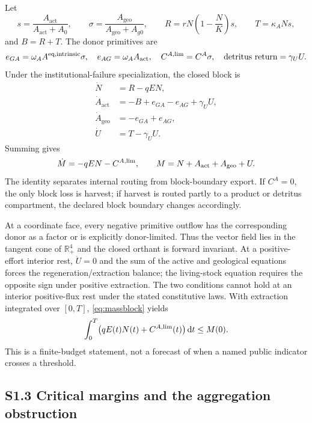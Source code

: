 \documentclass[11pt]{article}
\newcommand{\Rpos}{\mathbb{R}_{+}}
\newcommand{\dd}{\,\mathrm{d}}
\begin{document}
Let
\begin{equation}
s=\frac{A_{\mathrm{act}}}{A_{\mathrm{act}}+A_0},\qquad
\sigma=\frac{A_{\mathrm{geo}}}{A_{\mathrm{geo}}+A_{g0}},\qquad
R=rN\left(1-\frac NK\right)s,\qquad T=\kappa_A Ns,
\end{equation}
and $B=R+T$. The donor primitives are
\begin{equation}
e_{GA}=\omega_A A^{\rm eq,intrinsic}\sigma,
\quad e_{AG}=\omega_A A_{\mathrm{act}},
\quad C^{A,\rm lim}=C^A\sigma,
\quad \text{detritus return}=\gamma_UU.
\end{equation}
Under the institutional-failure specialization, the closed block is
\begin{align}
\dot N&=R-qEN,\\
\dot A_{\mathrm{act}}&=-B+e_{GA}-e_{AG}+\gamma_UU,\\
\dot A_{\mathrm{geo}}&=-e_{GA}+e_{AG},\\
\dot U&=T-\gamma_UU.
\end{align}
Summing gives
\begin{equation}
\dot M=-qEN-C^{A,\rm lim},\qquad M=N+A_{\mathrm{act}}+A_{\mathrm{geo}}+U.\label{eq:massblock}
\end{equation}
The identity separates internal routing from block-boundary export. If $C^A=0$, the only block loss is harvest; if harvest is routed partly to a product or detritus compartment, the declared block boundary changes accordingly.

At a coordinate face, every negative primitive outflow has the corresponding donor as a factor or is explicitly donor-limited. Thus the vector field lies in the tangent cone of $\Rpos^4$ and the closed orthant is forward invariant. At a positive-effort interior rest, $\dot U=0$ and the sum of the active and geological equations forces the regeneration/extraction balance; the living-stock equation requires the opposite sign under positive extraction. The two conditions cannot hold at an interior positive-flux rest under the stated constitutive laws. With extraction integrated over $[0,T]$, \eqref{eq:massblock} yields
\begin{equation}
\int_0^T\bigl(qE(t)N(t)+C^{A,\rm lim}(t)\bigr)\dd t\leq M(0).
\end{equation}
This is a finite-budget statement, not a forecast of when a named public indicator crosses a threshold.

\subsection*{S1.3 Critical margins and the aggregation obstruction}
\end{document}
